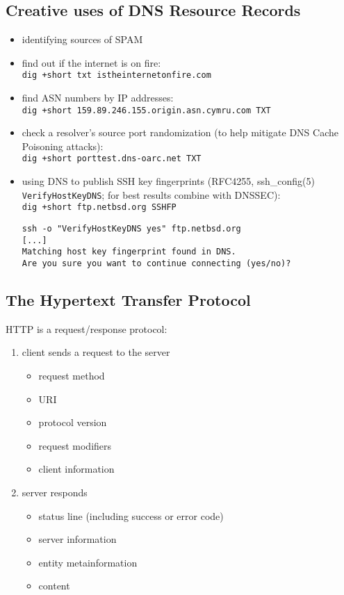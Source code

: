 \documentclass[xga]{xdvislides}
\begin{document}
\subsection{Creative uses of DNS Resource Records}
\begin{itemize}
	\item identifying sources of SPAM
	\item find out if the internet is on fire: \\
		\verb|dig +short txt istheinternetonfire.com|
	\item find ASN numbers by IP addresses: \\
		\verb|dig +short 159.89.246.155.origin.asn.cymru.com TXT|
	\item check a resolver's source port randomization (to help
		mitigate DNS Cache Poisoning attacks): \\
		\verb|dig +short porttest.dns-oarc.net TXT|
	\item using DNS to publish SSH key fingerprints (RFC4255,
ssh\_config(5) \verb+VerifyHostKeyDNS+; for best results combine with DNSSEC): \\
		\verb|dig +short ftp.netbsd.org SSHFP|
		\begin{verbatim}
ssh -o "VerifyHostKeyDNS yes" ftp.netbsd.org
[...]
Matching host key fingerprint found in DNS.
Are you sure you want to continue connecting (yes/no)?
\end{verbatim}
\end{itemize}

\subsection{The Hypertext Transfer Protocol}
HTTP is a request/response protocol:
\begin{enumerate}
	\item client sends a request to the server
		\begin{itemize}
			\item request method
			\item URI
			\item protocol version
			\item request modifiers
			\item client information
		\end{itemize}
	\item server responds
		\begin{itemize}
			\item status line (including success or error code)
			\item server information
			\item entity metainformation
			\item content
		\end{itemize}
\end{enumerate}
\end{document}
